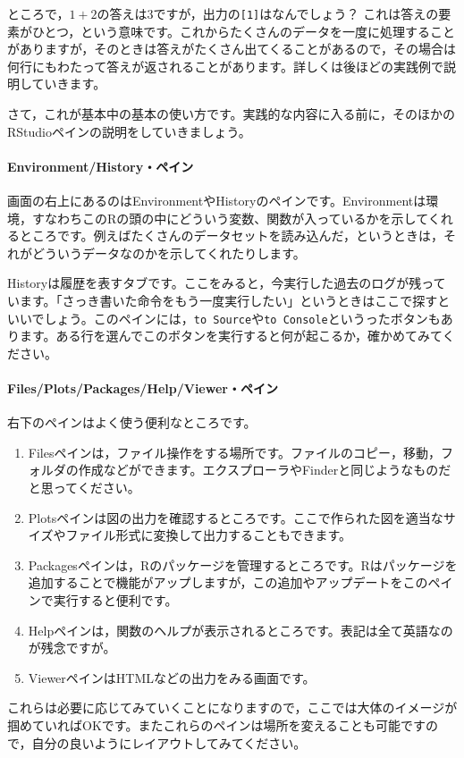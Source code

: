 \documentclass{ltjbook}
\begin{document}
ところで，$1+2$の答えは$3$ですが，出力の\verb|[1]|はなんでしょう？ これは答えの要素がひとつ，という意味です。これからたくさんのデータを一度に処理することがありますが，そのときは答えがたくさん出てくることがあるので，その場合は何行にもわたって答えが返されることがあります。詳しくは後ほどの実践例で説明していきます。

さて，これが基本中の基本の使い方です。実践的な内容に入る前に，そのほかのRStudioペインの説明をしていきましょう。
\paragraph{Environment/History・ペイン}
画面の右上にあるのはEnvironmentやHistoryのペインです。Environmentは環境，すなわちこのRの頭の中にどういう変数、関数が入っているかを示してくれるところです。例えばたくさんのデータセットを読み込んだ，というときは，それがどういうデータなのかを示してくれたりします。

Historyは履歴を表すタブです。ここをみると，今実行した過去のログが残っています。「さっき書いた命令をもう一度実行したい」というときはここで探すといいでしょう。このペインには，\texttt{to Source}や\texttt{to Console}というったボタンもあります。ある行を選んでこのボタンを実行すると何が起こるか，確かめてみてください。
\paragraph{Files/Plots/Packages/Help/Viewer・ペイン}
右下のペインはよく使う便利なところです。
\begin{enumerate}
	\item Filesペインは，ファイル操作をする場所です。ファイルのコピー，移動，フォルダの作成などができます。エクスプローラやFinderと同じようなものだと思ってください。
	\item Plotsペインは図の出力を確認するところです。ここで作られた図を適当なサイズやファイル形式に変換して出力することもできます。
	\item Packagesペインは，Rのパッケージを管理するところです。Rはパッケージを追加することで機能がアップしますが，この追加やアップデートをこのペインで実行すると便利です。
	\item Helpペインは，関数のヘルプが表示されるところです。表記は全て英語なのが残念ですが。
	\item ViewerペインはHTMLなどの出力をみる画面です。
\end{enumerate}
これらは必要に応じてみていくことになりますので，ここでは大体のイメージが掴めていればOKです。またこれらのペインは場所を変えることも可能ですので，自分の良いようにレイアウトしてみてください。
\end{document}
